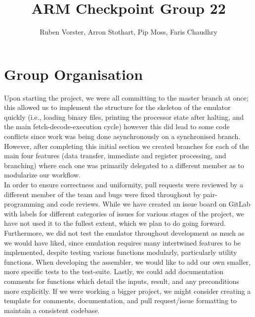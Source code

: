 \documentclass[11pt]{article}
\date{}
\begin{document}
\title{ARM Checkpoint Group 22}
\author{Ruben Vorster, Arron Stothart, Pip Moss, Faris Chaudhry}

\maketitle

\section{Group Organisation}
Upon starting the project, we were all committing to the master branch at once; this allowed us to implement the structure for the skeleton of the emulator quickly (i.e., loading binary files, printing the processor state after halting, and the main fetch-decode-execution cycle) however this did lead to some code conflicts since work was being done asynchronously on a synchronised branch. However, after completing this initial section we created branches for each of the main four features (data transfer, immediate and register processing, and branching) where each one was primarily delegated to a different member as to modularize our workflow. \\
In order to ensure correctness and uniformity, pull requests were reviewed by a different member of the team and bugs were fixed throughout by pair-programming and code reviews. While we have created an issue board on GitLab with labels for different categories of issues for various stages of the project, we have not used it to the fullest extent, which we plan to do going forward. Furthermore, we did not test the emulator throughout development as much as we would have liked, since emulation requires many intertwined features to be implemented, despite testing various functions modularly, particularly utility functions. When developing the assembler, we would like to add our own smaller, more specific tests to the test-suite. Lastly, we could add documentation comments for functions which detail the inputs, result, and any preconditions more explicitly. If we were working a bigger project, we might consider creating a template for comments, documentation, and pull request/issue formatting to maintain a consistent codebase.\\
\end{document}
